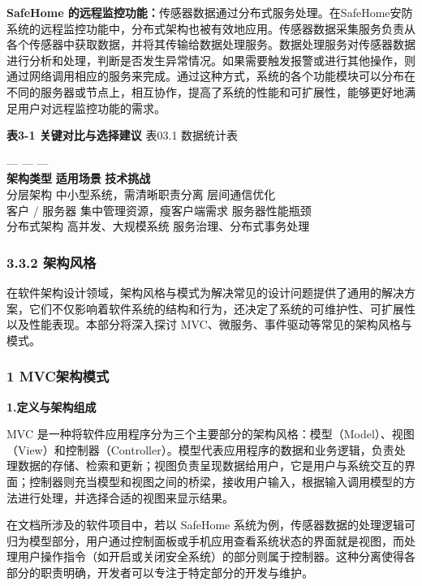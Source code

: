 \textbf{SafeHome 的远程监控功能：}传感器数据通过分布式服务处理。在SafeHome安防系统的远程监控功能中，分布式架构也被有效地应用。传感器数据采集服务负责从各个传感器中获取数据，并将其传输给数据处理服务。数据处理服务对传感器数据进行分析和处理，判断是否发生异常情况。如果需要触发报警或进行其他操作，则通过网络调用相应的服务来完成。通过这种方式，系统的各个功能模块可以分布在不同的服务器或节点上，相互协作，提高了系统的性能和可扩展性，能够更好地满足用户对远程监控功能的需求。

\textbf{表3-1 关键对比与选择建议} 表03.1 数据统计表

--- \textbar{} --- \textbar{} --- \textbar{}\\
\textbf{架构类型} \textbar{} \textbf{适用场景} \textbar{} \textbf{技术挑战} \textbar{}\\
分层架构 \textbar{} 中小型系统，需清晰职责分离 \textbar{} 层间通信优化 \textbar{}\\
客户 / 服务器 \textbar{} 集中管理资源，瘦客户端需求 \textbar{} 服务器性能瓶颈 \textbar{}\\
分布式架构 \textbar{} 高并发、大规模系统 \textbar{} 服务治理、分布式事务处理 \textbar{}

\subsubsection{3.3.2 架构风格}\label{ux67b6ux6784ux98ceux683c}

在软件架构设计领域，架构风格与模式为解决常见的设计问题提供了通用的解决方案，它们不仅影响着软件系统的结构和行为，还决定了系统的可维护性、可扩展性以及性能表现。本部分将深入探讨 MVC、微服务、事件驱动等常见的架构风格与模式。

\subsubsection{1 MVC架构模式}\label{mvcux67b6ux6784ux6a21ux5f0f}

\textbf{1.定义与架构组成}

MVC 是一种将软件应用程序分为三个主要部分的架构风格：模型（Model）、视图（View）和控制器（Controller）。模型代表应用程序的数据和业务逻辑，负责处理数据的存储、检索和更新；视图负责呈现数据给用户，它是用户与系统交互的界面；控制器则充当模型和视图之间的桥梁，接收用户输入，根据输入调用模型的方法进行处理，并选择合适的视图来显示结果。

在文档所涉及的软件项目中，若以 SafeHome 系统为例，传感器数据的处理逻辑可归为模型部分，用户通过控制面板或手机应用查看系统状态的界面就是视图，而处理用户操作指令（如开启或关闭安全系统）的部分则属于控制器。这种分离使得各部分的职责明确，开发者可以专注于特定部分的开发与维护。

